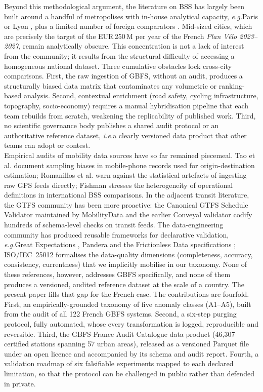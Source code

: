 \documentclass[a4paper,twoside]{article}
\newcommand{\ie}{\emph{i.e.}}
\newcommand{\eg}{\emph{e.g.}}
\begin{document}
Beyond this methodological argument, the literature on BSS has
largely been built around a handful of metropolises with in-house
analytical capacity, \eg Paris
\cite{Borgnat2011,Etienne2014} or Lyon \cite{Borgnat2011}, plus a
limited number of foreign comparators
\cite{Vogel2011,Hampshire2012}. Mid-sized cities, which are
precisely the target of the EUR\,250\,M per year of the French
\emph{Plan V\'elo 2023--2027}, remain analytically obscure. This
concentration is not a lack of interest from the community; it
results from the structural difficulty of accessing a homogeneous
national dataset. Three cumulative obstacles lock cross-city
comparisons. First, the raw ingestion of GBFS, without an audit,
produces a structurally biased data matrix that contaminates any
volumetric or ranking-based analysis. Second, contextual
enrichment (road safety, cycling infrastructure, topography,
socio-economy) requires a manual hybridisation pipeline that each
team rebuilds from scratch, weakening the replicability of
published work. Third, no scientific governance body publishes a
shared audit protocol or an authoritative reference dataset,
\ie a clearly versioned data product that other teams can adopt
or contest.\\

Empirical audits of mobility data sources have so far remained
piecemeal. Tao et al. \cite{Tao2020} document sampling biases in
mobile-phone records used for origin-destination estimation;
Romanillos et al. \cite{Romanillos2016} warn against the
statistical artefacts of ingesting raw GPS feeds directly;
Fishman \cite{Fishman2016} stresses the heterogeneity of
operational definitions in international BSS comparisons. In the
adjacent transit literature, the GTFS community has been more
proactive: the Canonical GTFS Schedule Validator maintained by
MobilityData \cite{MobilityData2024Validator} and the earlier
Conveyal validator \cite{Antrim2013Conveyal} codify hundreds of
schema-level checks on transit feeds. The data-engineering
community has produced reusable frameworks for declarative
validation, \eg Great Expectations
\cite{GreatExpectations2024}, Pandera \cite{Pandera2024} and
the Frictionless Data specifications
\cite{FrictionlessData2023}; ISO/IEC~25012
\cite{ISO25012} formalises the data-quality dimensions
(completeness, accuracy, consistency, currentness) that we
implicitly mobilise in our taxonomy. None of these references,
however, addresses GBFS specifically, and none of them produces a
versioned, audited reference dataset at the scale of a country.
The present paper fills that gap for the French case. The contributions are fourfold.
First, an empirically-grounded taxonomy of five anomaly classes
(A1--A5), built from the audit of all 122 French GBFS systems.
Second, a six-step purging protocol, fully automated, whose every
transformation is logged, reproducible and reversible. Third, the
GBFS France Audit Catalogue data product (46{,}307 certified
stations spanning 57 urban areas), released as a versioned
Parquet file under an open licence and accompanied by its schema
and audit report. Fourth, a validation roadmap of six falsifiable
experiments mapped to each declared limitation, so that the
protocol can be challenged in public rather than defended in
private.\\
\end{document}
